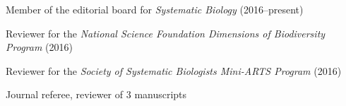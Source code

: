 \begin{tightItemize}
    \item Member of the editorial board for \emph{Systematic Biology}
            (2016--present)
    \item Reviewer for the \emph{National Science Foundation Dimensions of
            Biodiversity Program} (2016)
    \item Reviewer for the \emph{Society of Systematic Biologists Mini-ARTS
            Program} (2016)
    \item Journal referee, reviewer of 3 manuscripts
\end{tightItemize}
